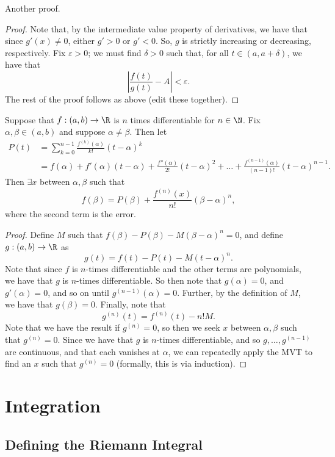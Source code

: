 \documentclass{notes}
\begin{document}
Another proof.
\begin{proof}
  Note that, by the intermediate value property of derivatives, we have that since $g'(x) \neq 0$,
  either $g' > 0$ or $g' < 0$. So, $g$ is strictly increasing or decreasing, respectively. Fix
  $\varepsilon > 0$; we must find $\delta > 0$ such that, for all $t\in (a, a + \delta)$, we have
  that $$\left| \frac{f(t)}{g(t)} - A \right| < \varepsilon.$$ The rest of the proof follows as
  above (edit these together).
\end{proof}

\begin{theorem}
  Suppose that $f: (a,b) \to \R$ is $n$ times differentiable for $n\in\N$. Fix $\alpha, \beta\in
  (a,b)$ and suppose $\alpha\neq\beta$. Then let
  \begin{align*}
    P(t) &= \sum_{k=0}^{n-1} \frac{f^{(k)}(\alpha)}{k!}(t-\alpha)^k \\
         &= f(\alpha) + f'(\alpha)(t-\alpha) + \frac{f''(\alpha)}{2!}(t-\alpha)^2 + \dots +
    \frac{f^{(n-1)}(\alpha)}{(n-1)!}(t-\alpha)^{n-1}.
  \end{align*}
  Then $\exists x$ between $\alpha, \beta$ such that $$f(\beta) = P(\beta) +
  \frac{f^{(n)}(x)}{n!}(\beta-\alpha)^n,$$ where the second term is the error. 
\end{theorem}
\begin{proof}
  Define $M$ such that $f(\beta) - P(\beta) - M(\beta - \alpha)^n = 0$, and define $g:(a,b)\to\R$ as
  $$g(t) = f(t) - P(t) - M(t-\alpha)^n.$$ Note that since $f$ is $n$-times differentiable and the
  other terms are polynomials, we have that $g$ is $n$-times differentiable. So then note that
  $g(\alpha) = 0$, and $g'(\alpha) = 0$, and so on until $g^{(n-1)}(\alpha) = 0$. Further, by the
  definition of $M$, we have that $g(\beta) = 0$. Finally, note that 
  $$g^{(n)}(t) = f^{(n)}(t) - n!M.$$ Note that we have the result if $g^{(n)} = 0$, so then we seek
  $x$ between $\alpha, \beta$ such that $g^{(n)} = 0.$ Since we have that $g$ is $n$-times
  differentiable, and so $g, \ldots, g^{(n-1)}$ are continuous, and that each vanishes at $\alpha$,
  we can repeatedly apply the MVT to find an $x$ such that $g^{(n)} = 0$ (formally, this is via
  induction).
\end{proof}

\section{Integration}
\subsection{Defining the Riemann Integral}
\end{document}
